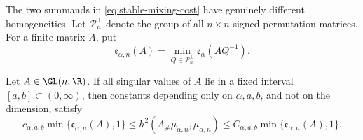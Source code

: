 The two summands in \eqref{eq:stable-mixing-cost} have genuinely different
homogeneities.  Let \(\mathcal P_n^{\pm}\) denote the group of all
\(n\times n\) signed permutation matrices.  For a finite matrix \(A\), put
\[
 \mathfrak e_{\alpha,n}(A)
 =\min_{Q\in\mathcal P_n^{\pm}}\mathfrak e_\alpha(AQ^{-1}).
\]

\begin{proposition}
\label{prop:anisotropic-stable-hellinger-coercivity}
Let \(A\in\GL(n,\R)\).  If all singular values of \(A\) lie in a fixed interval
\([a,b]\subset(0,\infty)\), then constants depending only on
\(\alpha,a,b\), and not on the dimension, satisfy
\begin{equation}
 c_{\alpha,a,b}\min\{\mathfrak e_{\alpha,n}(A),1\}
 \le h^2(A_\#\mu_{\alpha,n},\mu_{\alpha,n})
 \le C_{\alpha,a,b}\min\{\mathfrak e_{\alpha,n}(A),1\}.
 \label{eq:stable-hellinger-coercivity}
\end{equation}
\end{proposition}

